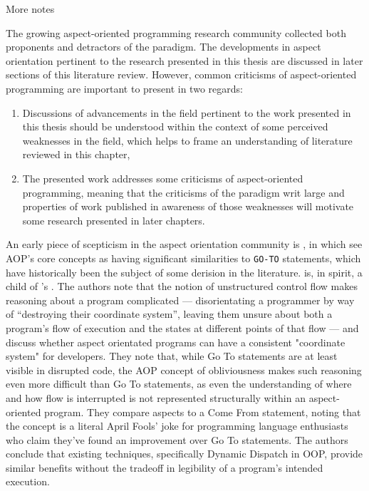 More notes


The growing aspect-oriented programming research community collected both
proponents and detractors of the paradigm. The developments in
aspect orientation pertinent to the research presented in this thesis are
discussed in later sections of this literature review. However, common
criticisms of aspect-oriented programming are important to present in two
regards:

\begin{enumerate}
    \item Discussions of advancements in the field pertinent to the work
    presented in this thesis should be understood within the context of some
    perceived weaknesses in the field, which helps to frame an understanding of
    literature reviewed in this chapter,
    \item The presented work addresses some criticisms of aspect-oriented
    programming, meaning that the criticisms of the paradigm writ large and
    properties of work published in awareness of those weaknesses will motivate
    some research presented in later chapters.
\end{enumerate}

An early piece of scepticism in the aspect orientation community is
\cite{Constantinides04aopconsidered}, in which
\citeauthor{Constantinides04aopconsidered} see AOP's core concepts as having
significant similarities to \lstinline{GO-TO} statements, which have
historically been the subject of some derision in the literature.
\cite{Constantinides04aopconsidered} is, in spirit, a child of
\citeauthor{dijkstra1968letters}'s . The authors
note that the notion of unstructured control flow makes reasoning about a
program complicated --- disorientating a programmer by way of ``destroying their
coordinate system'', leaving them unsure about both a program's flow of
execution and the states at different points of that flow --- and discuss
whether aspect orientated programs can have a consistent "coordinate system" for
developers. They note that, while Go To statements are at least visible in
disrupted code, the AOP concept of obliviousness makes such reasoning even more
difficult than Go To statements, as even the understanding of where and how flow
is interrupted is not represented structurally within an aspect-oriented
program. They compare aspects to a Come From statement, noting that the concept
is a literal April Fools' joke for programming language enthusiasts who claim
they've found an improvement over Go To statements. The authors conclude that
existing techniques, specifically Dynamic Dispatch in OOP, provide similar
benefits without the tradeoff in legibility of a program's intended execution.


